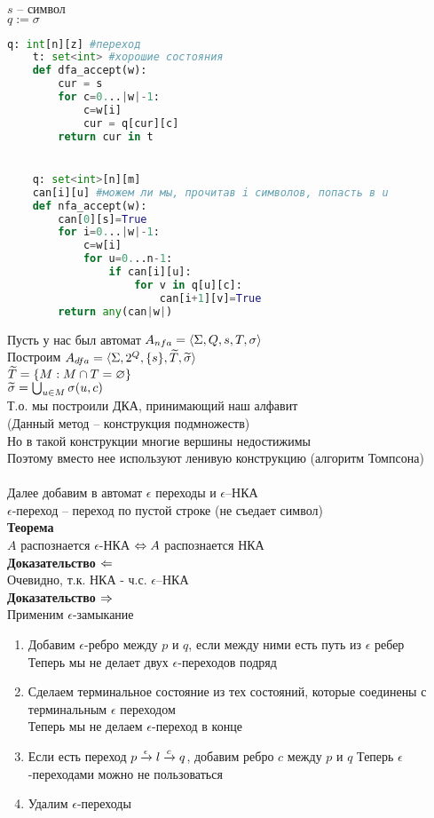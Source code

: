 \documentclass[12pt]{article}
\begin{document}
$s$ -- символ\\
$q:= \sigma$
\begin{lstlisting}[language=Python]
    q: int[n][z] #переход
    t: set<int> #хорошие состояния
    def dfa_accept(w):
        cur = s
        for c=0...|w|-1:
            c=w[i]
            cur = q[cur][c]
        return cur in t


    q: set<int>[n][m]
    can[i][u] #можем ли мы, прочитав i символов, попасть в u
    def nfa_accept(w):
        can[0][s]=True
        for i=0...|w|-1:
            c=w[i]
            for u=0...n-1:
                if can[i][u]:
                    for v in q[u][c]:
                        can[i+1][v]=True
        return any(can|w|)
\end{lstlisting}
Пусть у нас был автомат $A_{nfa}=\langle \Sigma, Q, s, T, \sigma\rangle$\\
Построим $A_{dfa}=\langle \Sigma, 2^Q, \{s\}, \widetilde T, \widetilde \sigma\rangle$\\
$\widetilde T = \{M: M\cap T = \varnothing\}$\\
$\widetilde \sigma = \bigcup_{u\in M} \sigma(u, c)$\\
Т.о. мы построили ДКА, принимающий наш алфавит\\
(Данный метод -- конструкция подмножеств)\\
Но в такой конструкции многие вершины недостижимы\\
Поэтому вместо нее используют ленивую конструкцию (алгоритм Томпсона)\\\\
Далее добавим в автомат $\epsilon$ переходы и $\epsilon$--НКА\\
$\epsilon$-переход -- переход по пустой строке (не съедает символ)\\
\textbf{Теорема}\\
$A$ распознается $\epsilon$-НКА $\Leftrightarrow A$ распознается НКА\\
\textbf{Доказательство $\Leftarrow$}\\
Очевидно, т.к. НКА - ч.с. $\epsilon$--НКА\\
\textbf{Доказательство $\Rightarrow$}\\
Применим $\epsilon$-замыкание
\begin{enumerate}
    \item Добавим $\epsilon$-ребро между $p$ и $q$, если между ними есть путь из $\epsilon$ ребер\\
    Теперь мы не делает двух $\epsilon$-переходов подряд
    \item Сделаем терминальное состояние из тех состояний, которые соединены с терминальным $\epsilon$ переходом\\
    Теперь мы не делаем $\epsilon$-переход в конце
    \item Если есть переход $p \xrightarrow{\epsilon} l \xrightarrow{c} q$, добавим ребро $c$ между $p$ и $q$
    Теперь $\epsilon$-переходами можно не пользоваться
    \item Удалим $\epsilon$-переходы
\end{enumerate}
\end{document}
